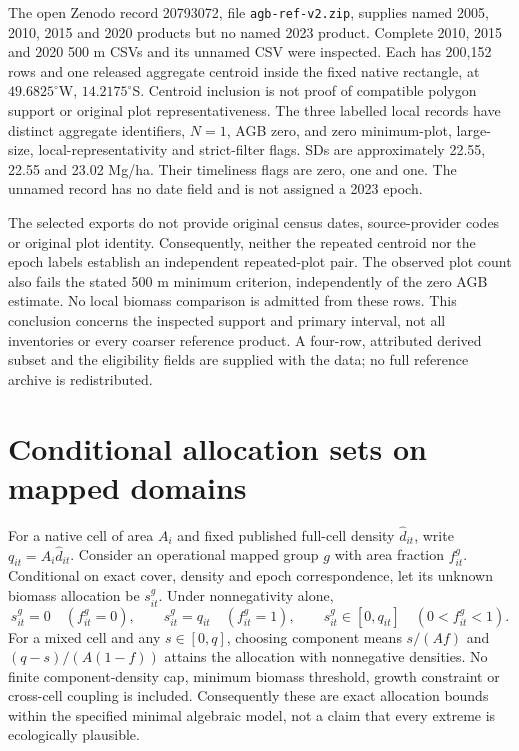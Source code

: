 \documentclass[11pt,a4paper]{article}
\begin{document}
The open Zenodo record 20793072, file \texttt{agb-ref-v2.zip}, supplies named 2005, 2010, 2015 and 2020 products but no named 2023 product. Complete 2010, 2015 and 2020 500 m CSVs and its unnamed CSV were inspected. Each has 200,152 rows and one released aggregate centroid inside the fixed native rectangle, at $49.6825^\circ$W, $14.2175^\circ$S. Centroid inclusion is not proof of compatible polygon support or original plot representativeness. The three labelled local records have distinct aggregate identifiers, $N=1$, AGB zero, and zero minimum-plot, large-size, local-representativity and strict-filter flags. SDs are approximately 22.55, 22.55 and 23.02 Mg/ha. Their timeliness flags are zero, one and one. The unnamed record has no date field and is not assigned a 2023 epoch.

The selected exports do not provide original census dates, source-provider codes or original plot identity. Consequently, neither the repeated centroid nor the epoch labels establish an independent repeated-plot pair. The observed plot count also fails the stated 500 m minimum criterion, independently of the zero AGB estimate. No local biomass comparison is admitted from these rows. This conclusion concerns the inspected support and primary interval, not all inventories or every coarser reference product. A four-row, attributed derived subset and the eligibility fields are supplied with the data; no full reference archive is redistributed.

\section{Conditional allocation sets on mapped domains}

For a native cell of area $A_i$ and fixed published full-cell density $\widehat d_{it}$, write $q_{it}=A_i\widehat d_{it}$. Consider an operational mapped group $g$ with area fraction $f_{it}^g$. Conditional on exact cover, density and epoch correspondence, let its unknown biomass allocation be $s_{it}^g$. Under nonnegativity alone,
\begin{equation}
s_{it}^g=0\quad(f_{it}^g=0),\qquad
s_{it}^g=q_{it}\quad(f_{it}^g=1),\qquad
s_{it}^g\in[0,q_{it}]\quad(0<f_{it}^g<1).
\end{equation}
For a mixed cell and any $s\in[0,q]$, choosing component means $s/(Af)$ and $(q-s)/(A(1-f))$ attains the allocation with nonnegative densities. No finite component-density cap, minimum biomass threshold, growth constraint or cross-cell coupling is included. Consequently these are exact allocation bounds within the specified minimal algebraic model, not a claim that every extreme is ecologically plausible.
\end{document}
